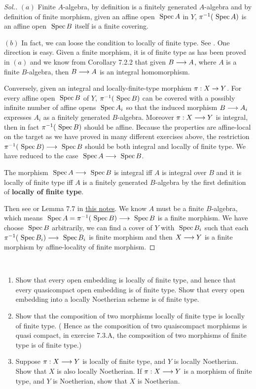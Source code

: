 \documentclass[11pt]{book} %
\begin{document}
\begin{proof}[Sol.]
$(a)$ Finite $A$-algebra, by definition is a finitely generated $A$-algebra and  by definition of finite morphism, given an affine open $\text{ Spec\,} A$ in $Y$, $\pi^{-1}(\text{ Spec\,} A)$ is an affine open $\text{ Spec\,} B$ itself is a finite covering.

$(b)$ {\color{red}In fact, we can loose the condition to locally of finite type.} See \cite[\href{https://stacks.math.columbia.edu/tag/01WJ}{Lemma 01WJ}]{stacks-project}. One direction is easy. Given a finite morphism, it is of finite type as has been proved in $(a)$ and we know from Corollary 7.2.2 that given $B\longrightarrow A$, where $A$ is a finite $B$-algebra, then $B\longrightarrow A$ is an integral homomorphism.

Conversely, given an integral and locally-finite-type morphism $\pi:X\rightarrow Y$. For every affine open $\text{ Spec\,} B$ of $Y$, $\pi^{-1}(\text{ Spec\,} B)$ can be covered with a possibly infinite number of affine opens $\text{ Spec\,} A_i$ so that the induced morphism $B\longrightarrow A_i$ expresses $A_i$ as a finitely generated $B$-algebra. Moreover $\pi:X\longrightarrow Y$ is integral, then in fact $\pi^{-1}(\text{ Spec\,} B)$ should be affine. Because the properties are affine-local on the target as we have proved in many different exercises above, the restriction $\pi^{-1}(\text{ Spec\,} B)\longrightarrow \text{ Spec\,} B$ should be both integral and locally of finite type. We have reduced to the case $\text{ Spec\,} A\longrightarrow \text{ Spec\,} B$.

The morphism $\text{ Spec\,} A\longrightarrow \text{ Spec\,} B$ is integral iff $A$ is  integral over $B$ and it is locally of finite type iff $A$ is a finitely generated $B$-algebra by the first definition of \textbf{locally of finite type}. 

Then see \cite[\href{https://stacks.math.columbia.edu/tag/02JJ}{Lemma 02JJ}]{stacks-project} or Lemma 7.7 in \href{https://github.com/ldXiao/Notes2017fall/blob/master/CA/CA.pdf}{this notes}. We know $A$ must be a finite $B$-algebra, which means $\text{ Spec\,} A=\pi^{-1}(\text{ Spec\,} B)\longrightarrow \text{ Spec\,} B$ is a finite morphism. We  have choose $\text{ Spec\,} B$ arbitrarily, we can find a cover of $Y$ with $\text{ Spec\,} B_i$ such that  each $\pi^{-1}(\text{ Spec\,} B_i)\longrightarrow \text{ Spec\,} B_i$ is finite morphism and then $X\longrightarrow Y$ is a finite morphism by affine-locality of finite morphism.
 \end{proof}
 \begin{exr}
 \ 
 \begin{enumerate}[label=(\alph*)]
\item Show that every open embedding is locally of finite type, and hence that every quasicompact open embedding is of finite type. Show that every open embedding into a locally Noetherian scheme is of finite type.
\item Show that the composition of two morphisms locally of finite type is locally of finite type. ( Hence as the composition of two quaiscompact morphisms is quasi compact, in exercise 7.3.A, the composition of two morphisms of finite type is of finite type.)
\item Suppose $\pi:X\longrightarrow Y$ is locally of finite type, and $Y$ is locally Noetherian. Show that $X$ is also locally Noetherian. If $\pi:X\longrightarrow Y$ is  a morphism of finite type, and $Y$ is Noetherian, show that $X$ is Noetherian. 
 \end{enumerate}
 \end{exr}
\end{document}

